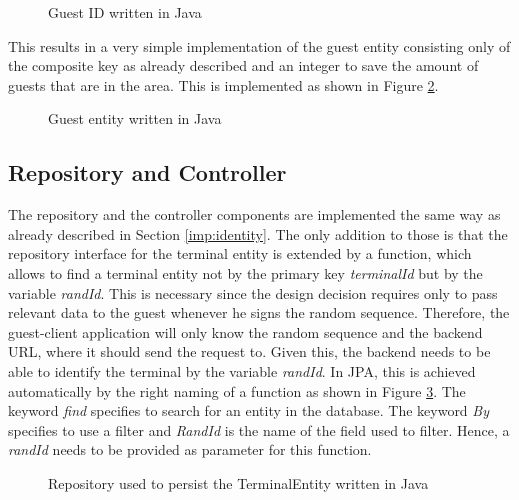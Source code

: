 \begin{figure}[H]
    
    \caption{Guest ID written in Java}
    \label{code:GuestID}
\end{figure}


This results in a very simple implementation of the guest entity consisting only of the composite key as already described and an integer to save the amount of guests that are in the area. This is implemented as shown in Figure \ref{code:GuestEntity}.

\begin{figure}[H]
    
    \caption{Guest entity written in Java}
    \label{code:GuestEntity}
\end{figure}

\subsection{Repository and Controller}

The repository and the controller components are implemented the same way as already described in Section \ref{imp:identity}. The only addition to those is that the repository interface for the terminal entity is extended by a function, which allows to find a terminal entity not by the primary key \textit{terminalId} but by the variable \textit{randId}. This is necessary since the design decision requires only to pass relevant data to the guest whenever he signs the random sequence. Therefore, the guest-client application will only know the random sequence and the backend URL, where it should send the request to. Given this, the backend needs to be able to identify the terminal by the variable \textit{randId}. In JPA, this is achieved automatically by the right naming of a function as shown in Figure \ref{code:repo:terminal}. The keyword \textit{find} specifies to search for an entity in the database. The keyword \textit{By} specifies to use a filter and \textit{RandId} is the name of the field used to filter. Hence, a \textit{ randId} needs to be provided as parameter for this function.

\begin{figure}[H]
    
    \caption{Repository used to persist the TerminalEntity written in Java}
    \label{code:repo:terminal}
\end{figure}

